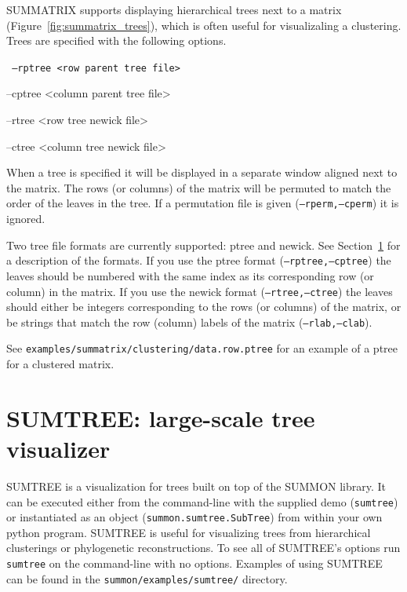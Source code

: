 \documentclass[12pt]{article}
\newcommand{\code}[1]{{\tt #1}}
\newcommand{\figref}[1]{Figure~\ref{#1}}
\newcommand{\secref}[1]{Section~\ref{#1}}
\begin{document}
SUMMATRIX supports displaying hierarchical trees next to a matrix 
(\figref{fig:summatrix_trees}), which is often useful for visualizaling
a clustering.  
Trees are specified with the following options.

\code{
  --rptree <row parent tree file>

  --cptree <column parent tree file>

  --rtree <row tree newick file>

  --ctree <column tree newick file>  
}

When a tree is specified it will be displayed in a separate window aligned next
to the matrix.  The rows (or columns) of the matrix will be permuted to match
the order of the leaves in the tree.  If a permutation file is given
(\code{--rperm,--cperm}) it is ignored.

Two tree file formats are currently supported: ptree and newick.  See
\secref{sec:sumtree} for a description of the formats.
If you use the ptree format (\code{--rptree,--cptree}) the leaves should be 
numbered with the same index as its corresponding row (or column) in the 
matrix.  If you use the newick format (\code{--rtree,--ctree}) the leaves should
either be integers corresponding to the rows (or columns) of the matrix, or 
be strings that match the row (column) labels of the matrix
(\code{--rlab,--clab}).
    
See \code{examples/summatrix/clustering/data.row.ptree} for an example of a
ptree for a clustered matrix.
   


\section{SUMTREE: large-scale tree visualizer}
\label{sec:sumtree}

SUMTREE is a visualization for trees built on top of the SUMMON library.  It can
be executed either from the command-line with the supplied demo (\code{sumtree})
or  instantiated as an object (\code{summon.sumtree.SubTree}) from within your
own python program.  SUMTREE is useful for visualizing trees from hierarchical
clusterings or phylogenetic reconstructions.  To see all of SUMTREE's options
run \code{sumtree} on the command-line with no options.  Examples of using
SUMTREE can be found in the \code{summon/examples/sumtree/} directory.
\end{document}
